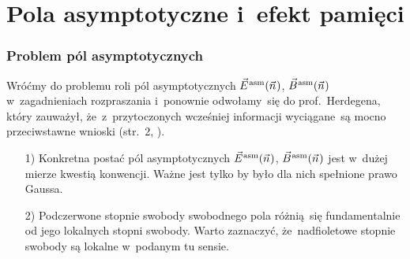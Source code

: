 \documentclass[10pt,t]{beamer}
\begin{document}
\section{Pola asymptotyczne i~efekt pamięci}



\begin{frame}
  \frametitle{Problem pól asymptotycznych}


  Wróćmy do problemu roli pól asymptotycznych $\vec{E}^{ \hspace{0.05em} \text{asm} }( \vec{n} \hspace{0.05em} )$, $\vec{B}^{ \hspace{0.05em} \text{asm} }( \vec{n} \hspace{0.05em} )$
  w~zagadnieniach rozpraszania i~ponownie odwołamy~się do
  prof.~Herdegena, który zauważył, że~z~przytoczonych wcześniej informacji
  wyciągane~są mocno przeciwstawne wnioski (str.~2,
  \parencite{Herdegen-Infrared-structure-beyond-locality-ETC-Ver-2024}).

  \begin{itemize}

  \item[1)] Konkretna postać pól asymptotycznych $\vec{E}^{ \hspace{0.05em} \text{asm} }( \vec{n} \hspace{0.05em} )$, $\vec{B}^{ \hspace{0.05em} \text{asm} }( \vec{n} \hspace{0.05em} )$
    jest w~dużej mierze kwestią konwencji. Ważne jest tylko by było
    dla nich spełnione prawo Gaussa.

  \item[2)] Podczerwone stopnie swobody swobodnego pola różnią~się
    fundamentalnie od jego lokalnych stopni swobody. Warto zaznaczyć,
    że~nadfioletowe stopnie swobody są lokalne w~podanym tu sensie.

  \end{itemize}

\end{frame}
\end{document}

